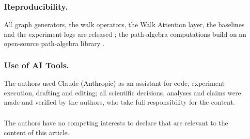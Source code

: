 \documentclass[runningheads]{llncs}
\begin{document}
\subsubsection*{Reproducibility.}
All graph generators, the walk operators, the Walk Attention layer, the
baselines and the experiment logs are released \cite{repo_walkattention}; the
path-algebra computations build on an open-source path-algebra library
\cite{repo_aiqquivers}.

\begin{credits}
\subsubsection{Use of AI Tools.}
The authors used Claude (Anthropic) as an assistant for code, experiment
execution, drafting and editing; all scientific decisions, analyses and claims
were made and verified by the authors, who take full responsibility for the
content.
\subsubsection{\discintname}
The authors have no competing interests to declare that are relevant to the
content of this article.
\end{credits}



\end{document}
